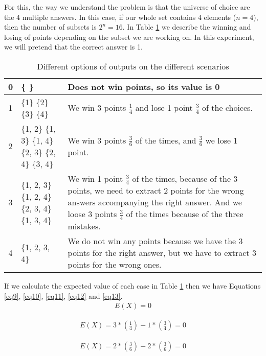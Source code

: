 \documentclass{article}
\begin{document}
For this, the way we understand the problem is that the universe of choice are the 4 multiple answers. In this case, if our whole set contains 4 elements ($n=4$), then the number of subsets is $2^n = 16$. In Table \ref{tab5} we describe the winning and losing of points depending on the subset we are working on. In this experiment, we will pretend that the correct answer is 1.\\

 \begin{table}[]\caption{Different options of outputs on the different scenarios}\label{tab5}
\centering
\begin{tabular}{| c | p{3cm} | p{9cm} | }
\hline
0 &\{ \} & Does not win points, so its value is 0 \\
\hline
1 & \{1\} \{2\} \{3\} \{4\}& We win 3 points $\frac{1}{4}$ and lose 1 point $\frac{3}{4}$ of the choices. \\
\hline
2 & \{1, 2\} \{1, 3\} \{1, 4\} \{2, 3\} \{2, 4\} \{3, 4\} & We win 3 points $\frac{3}{6}$ of the times, and $\frac{3}{6}$ we lose 1 point. \\
\hline
3 & \{1, 2, 3\} \{1, 2, 4\} \{2, 3, 4\} \{1, 3, 4\}& We win 1 point $\frac{3}{4}$ of the times, because of the 3 points, we need to extract 2 points for the wrong answers accompanying the right answer. And we loose 3 points $\frac{3}{4}$ of the times because of the three mistakes.  \\
\hline
4 & \{1, 2, 3, 4\} & We do not win any points because we have the 3 points for the right answer, but we have to extract 3 points for the wrong ones.  \\
\hline
\end{tabular}
\end{table}

If we calculate the expected value of each case in Table \ref{tab5} then we have Equations \ref{eq9}, \ref{eq10}, \ref{eq11}, \ref{eq12} and \ref{eq13}.\\

 \begin{eqnarray}
\label{eq9}
E(X) = 0
\end{eqnarray}

 \begin{eqnarray}
\label{eq10}
E(X) = 3* \left(\frac{1}{4}\right) - 1* \left(\frac{3}{4}\right) = 0
\end{eqnarray}

 \begin{eqnarray}
\label{eq11}
E(X) = 2* \left(\frac{3}{6}\right) - 2* \left(\frac{3}{6}\right) = 0
\end{eqnarray}
\end{document}

